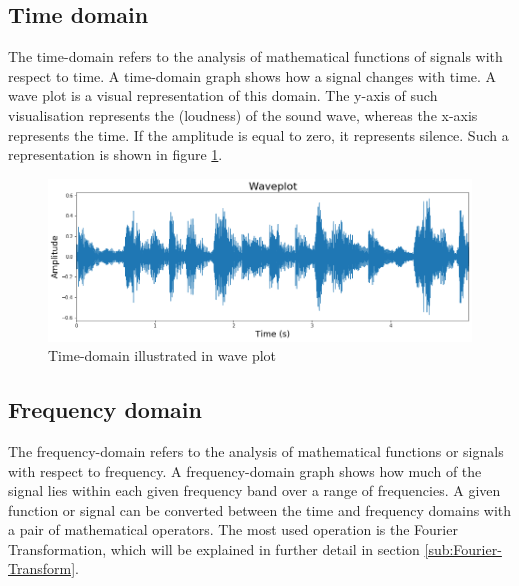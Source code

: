\subsection{Time domain}
\label{sub:Time-Domain}

The time-domain refers to the analysis of mathematical functions of signals with respect to time. A time-domain graph shows how a signal changes with time. 
\newline
\newline
A wave plot is a visual representation of this domain. The y-axis of such visualisation represents the  (loudness) of the sound wave, whereas the x-axis represents the time. If the amplitude is equal to zero, it represents silence. Such a representation is shown in figure \ref{fig:Waveplot-Time-Domain}.
\begin{figure}[htbp]
	\centering
	\includegraphics[scale=0.45]{baa-documentation/img/Waveplot_Visualisation.png}
	\caption[Time-domain illustrated in wave plot]{Time-domain illustrated in wave plot}
	\label{fig:Waveplot-Time-Domain}
\end{figure}

\subsection{Frequency domain}
\label{sub:Frequency-Domain}

The frequency-domain refers to the analysis of mathematical functions or signals with respect to frequency. A frequency-domain graph shows how much of the signal lies within each given frequency band over a range of frequencies. 
\newline
\newline
A given function or signal can be converted between the time and frequency domains with a pair of mathematical operators. The most used operation is the Fourier Transformation, which will be explained in further detail in section \ref{sub:Fourier-Transform}.

